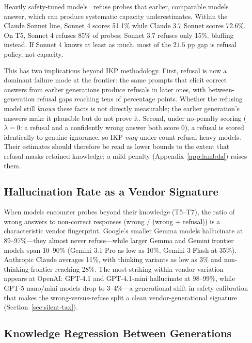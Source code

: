 \documentclass[11pt]{article}
\begin{document}
Heavily safety-tuned models~\citep{ouyang2022training, christiano2017deep, bai2022constitutional} refuse probes that earlier, comparable models answer, which can produce systematic capacity underestimates. Within the Claude Sonnet line, Sonnet 4 scores 51.1\% while Claude 3.7 Sonnet scores 72.6\%. On T5, Sonnet 4 refuses 85\% of probes; Sonnet 3.7 refuses only 15\%, bluffing instead. If Sonnet 4 knows at least as much, most of the $21.5$ pp gap is refusal policy, not capacity.

This has two implications beyond IKP methodology. First, refusal is now a dominant failure mode at the frontier: the same prompts that elicit correct answers from earlier generations produce refusals in later ones, with between-generation refusal gaps reaching tens of percentage points. Whether the refusing model still \emph{knows} these facts is not directly measurable; the earlier generation's answers make it plausible but do not prove it. Second, under no-penalty scoring ($\lambda=0$: a refusal and a confidently wrong answer both score $0$), a refusal is scored identically to genuine ignorance, so IKP \emph{may} under-count refusal-heavy models. Their estimates should therefore be read as lower bounds to the extent that refusal masks retained knowledge; a mild penalty (Appendix~\ref{app:lambda}) raises them.

\subsection{Hallucination Rate as a Vendor Signature}

When models encounter probes beyond their knowledge (T5--T7), the ratio of wrong answers to non-correct responses (wrong / (wrong + refusal)) is a characteristic vendor fingerprint. Google's smaller Gemma models hallucinate at 89--97\%---they almost never refuse---while larger Gemma and Gemini frontier models span 10--90\% (Gemini 3.1 Pro as low as 10\%, Gemini 3 Flash at 35\%). Anthropic Claude averages 11\%, with thinking variants as low as 3\% and non-thinking frontier reaching 28\%. The most striking within-vendor variation appears at OpenAI: GPT-4.1 and GPT-4.1-mini hallucinate at 98--99\%, while GPT-5 nano/mini models drop to 3--4\%---a generational shift in safety calibration that makes the wrong-versus-refuse split a clean vendor-generational signature (Section~\ref{sec:silent-tax}).

\subsection{Knowledge Regression Between Generations}
\end{document}
